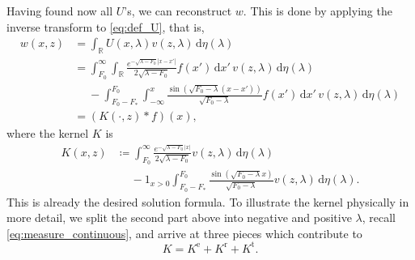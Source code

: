 \documentclass[11pt,twoside,reqno,centertags]{amsart}
\theoremstyle{definition}
\newcommand{\R}{\mathbb R}
\newcommand{\dd}{\mathrm d}
\begin{document}
Having found now all $U$'s, we can reconstruct $w$. This is done by applying the inverse transform \cite{Titchmarsh46} to \eqref{eq:def_U}, that is,
\begin{align}
	w(x,z) &= \int_\R U(x,\lambda)v(z,\lambda)\,\dd\eta(\lambda)\nonumber\\
	&=\int_{F_0}^\infty \int_\R\frac{e^{-\sqrt{\lambda-F_0}|x-x'|}}{2\sqrt{\lambda-F_0}}f(x')\,\dd x'\,v(z,\lambda)\,\dd\eta(\lambda)\nonumber\\
	&\quad\; -\int_{F_0-F_*}^{F_0}\int_{-\infty}^x\frac{\sin(\sqrt{F_0-\lambda}(x-x'))}{\sqrt{F_0-\lambda}}f(x')\,\dd x'\,v(z,\lambda)\,\dd\eta(\lambda)\nonumber\\
	&=(K(\cdot,z)\ast f)(x),\label{eq:formula_w}
\end{align}
where the kernel $K$ is
\begin{align*}
K(x,z) &\coloneqq \int_{F_0}^\infty\frac{e^{-\sqrt{\lambda-F_0}|x|}}{2\sqrt{\lambda-F_0}}v(z,\lambda)\,\dd\eta(\lambda)\\
&\quad\;-1_{x>0}\int_{F_0-F_*}^{F_0}\frac{\sin(\sqrt{F_0-\lambda}x)}{\sqrt{F_0-\lambda}}v(z,\lambda)\,\dd\eta(\lambda).
\end{align*}
This is already the desired solution formula. To illustrate the kernel physically in more detail, we split the second part above into negative and positive $\lambda$, recall \eqref{eq:measure_continuous}, and arrive at three pieces which contribute to
\begin{equation}\label{eq:K_split}
	K = K^{\mathrm{e}} + K^{\mathrm{r}} + K^{\mathrm{t}}.
\end{equation}
\end{document}
